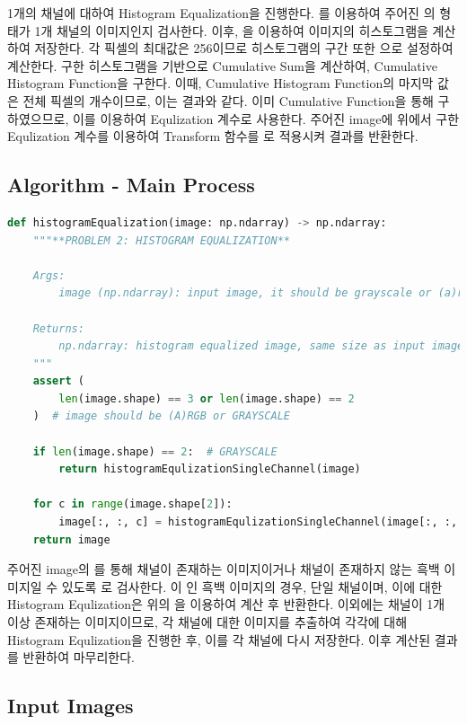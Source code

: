 \documentclass{report}
\begin{document}
1개의 채널에 대하여 Histogram Equalization을 진행한다.
를 이용하여 주어진 의 형태가 1개 채널의 이미지인지 검사한다.
이후, 을 이용하여 이미지의 히스토그램을 계산하여 저장한다.
각 픽셀의 최대값은 256이므로 히스토그램의 구간 또한 \code{[0,256]}으로 설정하여 계산한다.
구한 히스토그램을 기반으로 Cumulative Sum을 계산하여, Cumulative Histogram Function을 구한다.
이때, Cumulative Histogram Function의 마지막 값은 전체 픽셀의 개수이므로, 이는  결과와 같다.
이미 Cumulative Function을 통해 구하였으므로, 이를 이용하여 Equlization 계수로 사용한다.
주어진 image에 위에서 구한 Equlization 계수를 이용하여 Transform 함수를 로 적용시켜 결과를 반환한다.

\subsection*{Algorithm - Main Process}

\begin{lstlisting}[language=Python, caption=Primitive - histogramEqualization, firstnumber=129]
def histogramEqualization(image: np.ndarray) -> np.ndarray:
    """**PROBLEM 2: HISTOGRAM EQUALIZATION**

    Args:
        image (np.ndarray): input image, it should be grayscale or (a)rgb image

    Returns:
        np.ndarray: histogram equalized image, same size as input image
    """
    assert (
        len(image.shape) == 3 or len(image.shape) == 2
    )  # image should be (A)RGB or GRAYSCALE

    if len(image.shape) == 2:  # GRAYSCALE
        return histogramEqulizationSingleChannel(image)

    for c in range(image.shape[2]):
        image[:, :, c] = histogramEqulizationSingleChannel(image[:, :, c])
    return image
\end{lstlisting}

주어진 image의 를 통해 채널이 존재하는 이미지이거나 채널이 존재하지 않는 흑백 이미지일 수 있도록 로 검사한다.
이 인 흑백 이미지의 경우, 단일 채널이며, 이에 대한 Histogram Equlization은 위의 을 이용하여 계산 후 반환한다.
이외에는 채널이 1개 이상 존재하는 이미지이므로, 각 채널에 대한 이미지를 추출하여 각각에 대해 Histogram Equlization을 진행한 후, 이를 각 채널에 다시 저장한다.
이후 계산된 결과를 반환하여 마무리한다.

\subsection*{Input Images}
\end{document}
